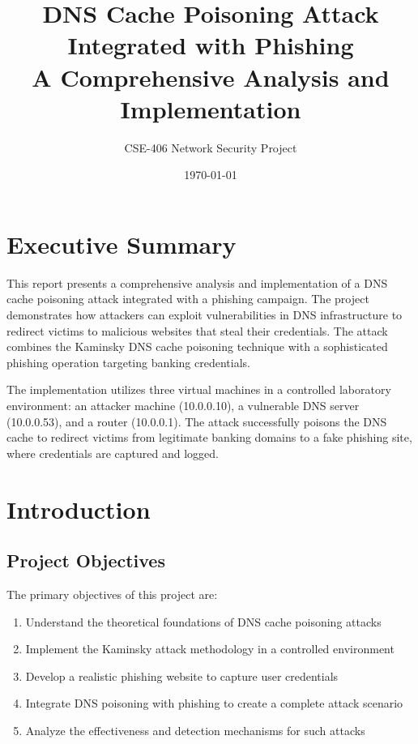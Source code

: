 \documentclass[12pt,a4paper]{article}
\title{\textbf{DNS Cache Poisoning Attack Integrated with Phishing} \\ 
       \large A Comprehensive Analysis and Implementation}
\author{CSE-406 Network Security Project}
\date{\today}
\begin{document}
\maketitle

\tableofcontents
\newpage

\section{Executive Summary}

This report presents a comprehensive analysis and implementation of a DNS cache poisoning attack integrated with a phishing campaign. The project demonstrates how attackers can exploit vulnerabilities in DNS infrastructure to redirect victims to malicious websites that steal their credentials. The attack combines the Kaminsky DNS cache poisoning technique with a sophisticated phishing operation targeting banking credentials.

The implementation utilizes three virtual machines in a controlled laboratory environment: an attacker machine (10.0.0.10), a vulnerable DNS server (10.0.0.53), and a router (10.0.0.1). The attack successfully poisons the DNS cache to redirect victims from legitimate banking domains to a fake phishing site, where credentials are captured and logged.

\section{Introduction}

\subsection{Project Objectives}

The primary objectives of this project are:
\begin{enumerate}
    \item Understand the theoretical foundations of DNS cache poisoning attacks
    \item Implement the Kaminsky attack methodology in a controlled environment
    \item Develop a realistic phishing website to capture user credentials
    \item Integrate DNS poisoning with phishing to create a complete attack scenario
    \item Analyze the effectiveness and detection mechanisms for such attacks
\end{enumerate}
\end{document}
